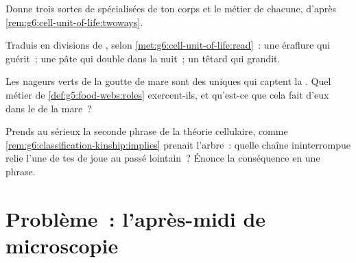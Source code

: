 \begin{exercise}[$\star\star$]\label{exo:g6:cell-unit-of-life:9}
Donne trois sortes de  spécialisées de ton corps et le
métier de chacune, d'après \cref{rem:g6:cell-unit-of-life:twoways}.
\end{exercise}

\begin{exercise}[$\star\star$]\label{exo:g6:cell-unit-of-life:10}
Traduis en divisions de , selon
\cref{met:g6:cell-unit-of-life:read}~: une éraflure qui guérit~; une
pâte qui double dans la nuit~; un têtard qui grandit.
\end{exercise}

\begin{exercise}[$\star\star$]\label{exo:g6:cell-unit-of-life:11}
Les nageurs verts de la goutte de mare sont des  uniques qui
captent la . Quel métier de
\cref{def:g5:food-webs:roles} exercent-ils, et qu'est-ce que cela
fait d'eux dans le  de la mare~?
\end{exercise}

\begin{exercise}[$\star\star\star$]\label{exo:g6:cell-unit-of-life:12}
Prends au sérieux la seconde phrase de la théorie cellulaire, comme
\cref{rem:g6:classification-kinship:implies} prenait l'arbre~:
quelle chaîne ininterrompue relie l'une de tes  de joue au
passé lointain~? Énonce la conséquence en une phrase.
\end{exercise}

\section{Problème~: l'après-midi de microscopie}


